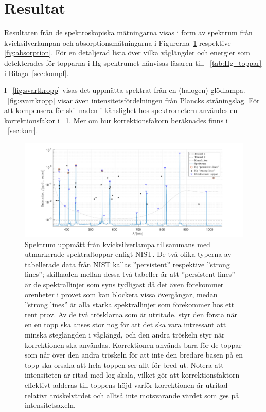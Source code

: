 \documentclass[11pt,a4paper]{article}
\newcommand{\figref}{\figurename~\ref}
\newcommand{\tabref}{\tablename~\ref} %
\begin{document}
\section{Resultat}
Resultaten från de spektroskopiska mätningarna visas i form av
spektrum från kvicksilverlampan och absorptionsmätningarna i
Figurerna~\ref{fig:Hg_spektrum} respektive \ref{fig:absorption}.
För en detaljerad lista över vilka våglängder och energier som
detekterades för topparna i Hg-spektrumet hänvisas läsaren till
\tabref{tab:Hg_toppar} i Bilaga~\ref{sec:kompl}.  

I \figref{fig:svartkropp} visas det uppmätta spektrat från en
(halogen) glödlampa. \figref{fig:svartkropp} visar även
intensitetsfördelningen från Plancks stråningslag. För att kompensera
för skillnaden i känslighet hos spektrometern användes en
korrektionsfakor i \figref{fig:Hg_spektrum}. Mer om hur
korrektionsfakorn beräknades finns i \appendixname~\ref{sec:korr}.


\begin{figure}
\centering
\centerline{ %
\includegraphics[width=1.2\textwidth]{Hg_spektrum.pdf}
}
\caption{Spektrum uppmätt från kvicksilverlampa tillsammans med
  utmarkerade spektraltoppar enligt NIST\cite{NIST_spectrum}. De två
  olika typerna av tabellerade data från NIST kallas ''persistent'' 
  respektive ''strong lines''; skillnaden mellan dessa två tabeller är
  att ''persistent lines'' är de spektrallinjer som syns tydligast
  då det även förekommer orenheter i provet som kan blockera vissa
  övergångar, medan ''strong lines'' är alla starka spektrallinjer som
  förekommer hos ett rent prov.
  Av de två trösklarna som är utritade, styr den första när en en topp
  ska anses stor nog för att det ska vara intressant att minska
  steglängden i våglängd, och den andra tröskeln styr när korrektionen
  ska användas. Korrektionen används bara för de toppar som når över
  den andra tröskeln för att inte den bredare basen på en topp ska
  orsaka att hela toppen ser allt för bred ut. Notera att intensiteten
  är ritad med log-skala, vilket gör att korrektionsfaktorn effektivt
  adderas till toppens höjd varför korrektionen är utritad relativt
  tröskelvärdet och alltså inte motsvarande värdet som ges på
  intensitetsaxeln. 
}
\label{fig:Hg_spektrum}
\end{figure}
\end{document}
